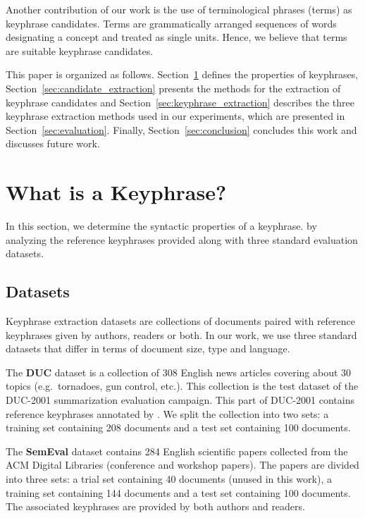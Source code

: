   Another contribution of our work is the use of terminological phrases (terms)
  as keyphrase candidates. Terms are grammatically arranged sequences of
  words designating a concept and treated as single units. Hence, we believe
  that terms are suitable keyphrase candidates.

  This paper is organized as follows.
  Section~\ref{sec:definition_of_candidate_keyphrases} defines the properties of
  keyphrases, Section~\ref{sec:candidate_extraction} presents the methods for
  the extraction of keyphrase candidates and
  Section~\ref{sec:keyphrase_extraction} describes the three keyphrase
  extraction methods used in our experiments, which are presented in
  Section~\ref{sec:evaluation}. Finally, Section~\ref{sec:conclusion} concludes
  this work and discusses future work.

\section{What is a Keyphrase?}
\label{sec:definition_of_candidate_keyphrases}
  In this section, we determine the syntactic properties of a keyphrase. by
  analyzing the reference keyphrases provided along with three standard
  evaluation datasets.

  \subsection{Datasets}
  \label{subsec:keyphrase_extraction_datasets}
    Keyphrase extraction datasets are collections of documents paired with
    reference keyphrases given by authors, readers or both. In our work, we use
    three standard datasets that differ in terms of document size,  type and
    language.

    The \textbf{DUC} dataset \cite{over2001duc} is a collection of 308 English
    news articles covering about 30 topics (e.g.~tornadoes, gun control, etc.).
    This collection is the test dataset of the DUC-2001 summarization evaluation
    campaign. This part of DUC-2001 contains reference keyphrases annotated by
    . We split the collection into two sets: a
    training set containing 208 documents and a test set containing 100
    documents.

    The \textbf{SemEval} dataset \cite{kim2010semeval} contains 284 English
    scientific papers collected from the ACM Digital Libraries (conference and
    workshop papers). The papers are divided into three sets: a trial set
    containing 40 documents (unused in this work), a training set containing 144
    documents and a test set containing 100 documents. The associated keyphrases
    are provided by both authors and readers.

